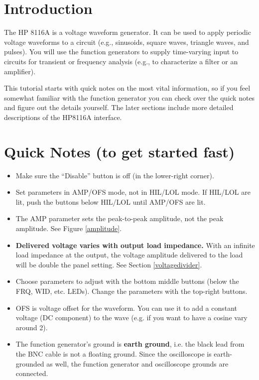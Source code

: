 \documentclass{article}
\begin{document}
\thispagestyle{plain}


\tableofcontents

\section{Introduction}

The HP 8116A is a voltage waveform generator. It can be used to apply periodic voltage waveforms to a circuit (e.g., sinusoids, square waves, triangle waves, and pulses). You will use the function generators to supply time-varying input to circuits for transient or frequency analysis (e.g., to characterize a filter or an amplifier). 

This tutorial starts with quick notes on the most vital information, so if you feel somewhat familiar with the function generator you can check over the quick notes and figure out the details yourself. The later sections include more detailed descriptions of the HP8116A interface.

\section{Quick Notes (to get started fast)}
\begin{itemize}
\item Make sure the ``Disable'' button is off (in the lower-right corner).
\item Set parameters in AMP/OFS mode, not in HIL/LOL mode. If HIL/LOL are lit, push the buttons below HIL/LOL until AMP/OFS are lit.
\item The AMP parameter sets the peak-to-peak amplitude, not the peak amplitude. See Figure \ref{amplitude}.
\item \textbf{Delivered voltage varies with output load impedance.} With an infinite load impedance at the output, the voltage amplitude delivered to the load will be double the panel setting. See Section \ref{voltagedivider}.
\item Choose parameters to adjust with the bottom middle buttons (below the FRQ, WID, etc. LEDs). Change the parameters with the top-right buttons.
\item OFS is voltage offset for the waveform. You can use it to add a constant voltage (DC component) to the wave (e.g. if you want to have a cosine vary around \unit{2}{\volt}).
\item The function generator's ground is \textbf{earth ground}, i.e. the black lead from the BNC cable is not a floating ground. Since the oscilloscope is earth-grounded as well, the function generator and oscilloscope grounds are connected. 
\end{itemize}
\end{document}
